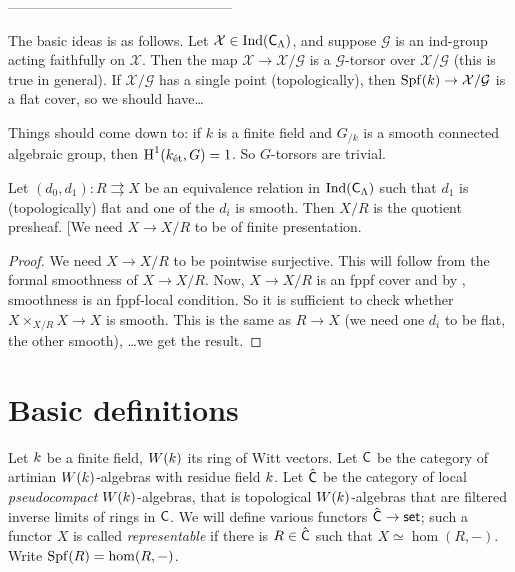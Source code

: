 \documentclass[phd,cornellheadings,draft]{cornell}
\begin{document}
------------------------------------------------

The basic ideas is as follows. Let $\mathcal X\in \operatorname{Ind}(\mathsf{C}_\Lambda)$, 
and suppose $\mathcal G$ is an ind-group acting faithfully on $\mathcal X$. Then 
the map $\mathcal X\to \mathcal X/\mathcal G$ is a $\mathcal G$-torsor over 
$\mathcal X/\mathcal G$ (this is true in general). If $\mathcal X/\mathcal G$ has a single 
point (topologically), then $\operatorname{Spf}(k) \to \mathcal X/\mathcal G$ is a 
flat cover, so we should have\ldots 

Things should come down to: if $k$ is a finite field and $G_{/k}$ is a smooth 
connected algebraic group, then $\operatorname{H}^1(k_\textnormal{\'et},G)=1$. So $G$-torsors 
are trivial. 

\begin{theorem}
Let $(d_0,d_1)\colon R\rightrightarrows X$ be an equivalence relation in 
$\operatorname{Ind}(\mathsf{C}_\Lambda)$ such that $d_1$ is (topologically) flat and 
one of the $d_i$ is smooth. Then $X/R$ is the quotient presheaf. [We need 
$X\to X/R$ to be of finite presentation. 
\end{theorem}
\begin{proof}
We need $X\to X/R$ to be pointwise surjective. This will follow from the formal 
smoothness of $X\to X/R$. Now, $X\to X/R$ is an fppf cover and by 
\cite[17.7.3(ii)]{ega4-4}, smoothness is an fppf-local condition. So it is 
sufficient to check whether $X\times_{X/R} X\to X$ is smooth. This is the same 
as $R\to X$ (we need one $d_i$ to be flat, the other smooth), \ldots we get the 
result. 
\end{proof}





\section{Basic definitions}

Let $k$ be a finite field, $W(k)$ its ring of Witt vectors. 
Let $\mathsf{C}$ be the category of artinian $W(k)$-algebras with residue field $k$. 
Let $\hat{\mathsf{C}}$ be the category of local \emph{pseudocompact} $W(k)$-algebras, that is topological $W(k)$-algebras that are filtered inverse limits of rings in $\mathsf{C}$. 
We will define various functors $\hat{\mathsf{C}}\to \mathsf{set}$; such a functor $X$ is called \emph{representable} if there is $R\in \hat{\mathsf{C}}$ such that $X\simeq \hom(R,-)$. 
Write $\operatorname{Spf}(R)=\hom(R,-)$. 
\end{document}
